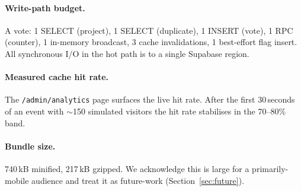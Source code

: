\paragraph{Write-path budget.} A vote: 1 SELECT (project), 1 SELECT
(duplicate), 1 INSERT (vote), 1 RPC (counter), 1 in-memory broadcast,
3 cache invalidations, 1 best-effort flag insert. All synchronous I/O
in the hot path is to a single Supabase region.

\paragraph{Measured cache hit rate.} The
\texttt{/admin/analytics} page surfaces the live hit rate. After the
first 30\,seconds of an event with $\sim$150 simulated visitors the
hit rate stabilises in the 70--80\% band.

\paragraph{Bundle size.} 740\,kB minified, 217\,kB gzipped. We acknowledge
this is large for a primarily-mobile audience and treat it as
future-work (Section~\ref{sec:future}).
